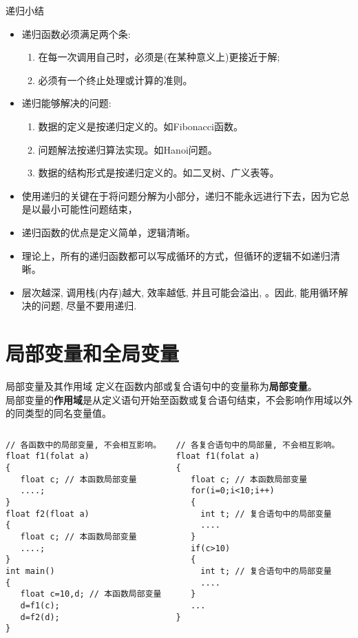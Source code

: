 \begin{frame}{递归小结}
\begin{itemize}
	\item 递归函数必须满足两个条:
	\begin{enumerate}
		\item 在每一次调用自己时，必须是(在某种意义上)更接近于解;
		\item 必须有一个终止处理或计算的准则。
	\end{enumerate}
    \item 递归能够解决的问题:
    \begin{enumerate}
    	\item 数据的定义是按递归定义的。如Fibonacci函数。
    	\item 问题解法按递归算法实现。如Hanoi问题。
    	\item 数据的结构形式是按递归定义的。如二叉树、广义表等。
    \end{enumerate}
	\item 使用递归的关键在于将问题分解为小部分，递归不能永远进行下去，因为它总是以最小可能性问题结束，
	\item 递归函数的优点是定义简单，逻辑清晰。
	\item 理论上，所有的递归函数都可以写成循环的方式，但循环的逻辑不如递归清晰。
	\item 层次越深, 调用栈(内存)越大, 效率越低, 并且可能会溢出, 。因此, 能用循环解决的问题, 尽量不要用递归.
	
\end{itemize}
\end{frame}

\section{局部变量和全局变量}

\begin{frame}{局部变量及其作用域}
定义在函数内部或复合语句中的变量称为\textbf{局部变量}。\\
局部变量的\textbf{作用域}是从定义语句开始至函数或复合语句结束，不会影响作用域以外的同类型的同名变量值。 
\begin{columns}[T]
\begin{lstlisting}
// 各函数中的局部变量, 不会相互影响。
float f1(folat a) 
{
   float c; // 本函数局部变量
   ....;
}
float f2(float a)
{ 
   float c; // 本函数局部变量
   ....;
}
int main()
{
   float c=10,d; // 本函数局部变量
   d=f1(c);
   d=f2(d);
}
\end{lstlisting}
\begin{lstlisting}
// 各复合语句中的局部量, 不会相互影响。
float f1(folat a) 
{
   float c; // 本函数局部变量
   for(i=0;i<10;i++) 
   {
     int t; // 复合语句中的局部变量 
     ....
   }
   if(c>10)
   {
     int t; // 复合语句中的局部变量 
     ....
   }
   ...
}
\end{lstlisting}
\end{columns}
~\\
\end{frame}

